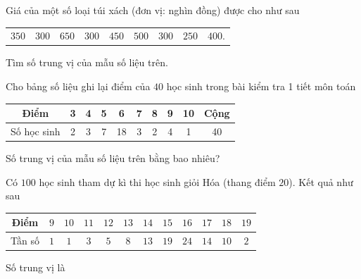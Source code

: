\begin{bt}%
	Giá của một số loại túi xách (đơn vị: nghìn đồng) được cho như sau
	\begin{center}\begin{tabular}{lllllllll}
			$350$ & $300$ & $650$ & $300$ & $450$ & $500$ & $300$ & $250$ & $400$.
		\end{tabular}
	\end{center}
	Tìm số trung vị của mẫu số liệu trên.
\end{bt}

\begin{bt}%
	Cho bảng số liệu ghi lại điểm của $40$ học sinh trong bài kiểm tra 1 tiết môn toán
	\begin{center}
		\begin{tabular}{|c|c|c|c|c|c|c|c|c|c|}
			\hline
			Điểm&3&4&5&6&7&8&9&10&Cộng\\
			\hline
			Số học sinh&2&3&7&18&3&2&4&1&40\\
			\hline
		\end{tabular}
	\end{center}
	Số trung vị của mẫu số liệu trên bằng bao nhiêu?
\end{bt}

\begin{bt}%
	Có $100$ học sinh tham dự kì thi học sinh giỏi Hóa (thang điểm $20$). Kết quả như sau
	\begin{center}
		\begin{tabular}{|@{\quad}c@{\quad}|@{\quad}c@{\quad}|@{\quad}c@{\quad}|@{\quad}c@{\quad}|@{\quad}c@{\quad}|@{\quad}c@{\quad}|@{\quad}c@{\quad}|@{\quad}c@{\quad}|@{\quad}c@{\quad}|@{\quad}c@{\quad}|@{\quad}c@{\quad}|@{\quad}c@{\quad}|}
			\hline
			Điểm&$9$&$10$&$11$&$12$&$13$&$14$&$15$&$16$&$17$&$18$&$19$\\
			\hline
			Tần số&$1$&$1$&$3$&$5$&$8$&$13$&$19$&$24$&$14$&$10$&$2$\\
			\hline
		\end{tabular}
	\end{center}
	Số trung vị là
\end{bt}
